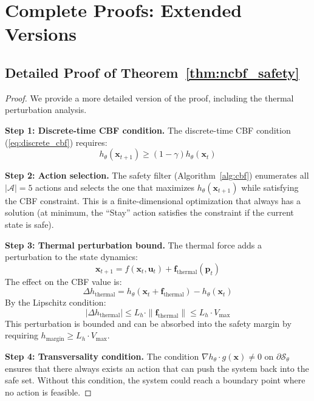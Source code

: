 \documentclass[12pt,a4paper]{article}
\DeclareRobustCommand{\cA}{\mathcal{A}}
\DeclareRobustCommand{\cS}{\mathcal{S}}
\DeclareRobustCommand{\vect}[1]{\bm{#1}}
\begin{document}
\section{Complete Proofs: Extended Versions}
\label{app:extended_proofs}

\subsection{Detailed Proof of Theorem~\ref{thm:ncbf_safety}}

\begin{proof}
We provide a more detailed version of the proof, including the thermal perturbation analysis.

\textbf{Step 1: Discrete-time CBF condition.} The discrete-time CBF condition (\eqref{eq:discrete_cbf}) requires:
\begin{equation}
    h_\theta(\vect{x}_{t+1}) \geq (1 - \gamma) h_\theta(\vect{x}_t)
\end{equation}

\textbf{Step 2: Action selection.} The safety filter (Algorithm~\ref{alg:cbf}) enumerates all $|\cA| = 5$ actions and selects the one that maximizes $h_\theta(\vect{x}_{t+1})$ while satisfying the CBF constraint. This is a finite-dimensional optimization that always has a solution (at minimum, the ``Stay'' action satisfies the constraint if the current state is safe).

\textbf{Step 3: Thermal perturbation bound.} The thermal force adds a perturbation to the state dynamics:
\begin{equation}
    \vect{x}_{t+1} = f(\vect{x}_t, \vect{u}_t) + \vect{f}_{\text{thermal}}(\vect{p}_t)
\end{equation}
The effect on the CBF value is:
\begin{equation}
    \Delta h_{\text{thermal}} = h_\theta(\vect{x}_t + \vect{f}_{\text{thermal}}) - h_\theta(\vect{x}_t)
\end{equation}
By the Lipschitz condition:
\begin{equation}
    |\Delta h_{\text{thermal}}| \leq L_h \cdot \|\vect{f}_{\text{thermal}}\| \leq L_h \cdot V_{\max}
\end{equation}
This perturbation is bounded and can be absorbed into the safety margin by requiring $h_{\text{margin}} \geq L_h \cdot V_{\max}$.

\textbf{Step 4: Transversality condition.} The condition $\nabla h_\theta \cdot g(\vect{x}) \neq 0$ on $\partial\cS_\theta$ ensures that there always exists an action that can push the system back into the safe set. Without this condition, the system could reach a boundary point where no action is feasible.


\end{proof}
\end{document}
